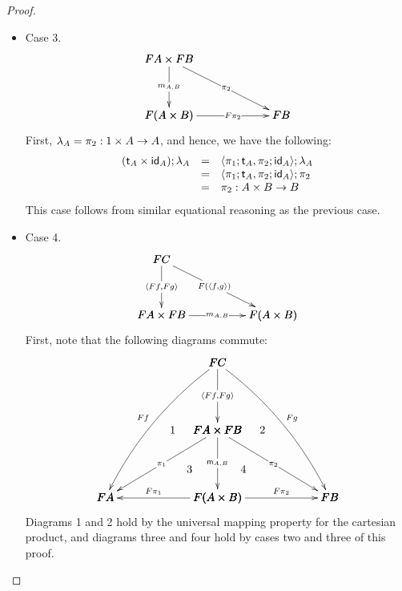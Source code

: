 \begin{proof}
\begin{itemize}
  \item[] Case 3.\\    
    \[
      \bfig    
      \btriangle|mmm|<1000,500>[
        FA \times FB`
        F(A \times B)`
        FB;
        m_{A,B}`
        \pi_2`
        F\pi_2]
      \efig
    \]
    First, $\lambda_A = \pi_2 : 1 \times A \rightarrow A$, and hence, we have the following:
      \[
      \begin{array}{lll}
        (\mathsf{t}_A \times \mathsf{id}_A);\lambda_A & = & \langle \pi_1;\mathsf{t}_A, \pi_2;\mathsf{id}_A \rangle;\lambda_A\\
        & = & \langle \pi_1;\mathsf{t}_A, \pi_2;\mathsf{id}_A \rangle;\pi_2\\
        & = & \pi_2 : A \times B \rightarrow B
      \end{array}
      \]
      This case follows from similar equational reasoning
      as the previous case.      
      
  \item[] Case 4.\\    
    \[
    \bfig
    \btriangle|mmm|<1000,500>[
      FC`
      FA \times FB`
      F(A \times B);
      \langle Ff, Fg \rangle`
      F(\langle f, g \rangle)`
      m_{A,B}]
    \efig
    \]
    First, note that the following diagrams commute:
    \[
    \bfig
    \Atrianglepair|mmmaa|/->`->`->`<-`->/<1000,600>[
      FA \times FB`
      FA`
      F(A \times B)`
      FB;
      \pi_1`
      \m{A,B}`
      \pi_2`
      F\pi_1`
      F\pi_2]
    \morphism(1000,1200)|m|<0,-600>[FC`FA \times FB;\langle Ff, Fg \rangle]
    \morphism(1000,1200)/{@{>}@/^-1em/}/<-1000,-1200>[FC`FA;Ff]
    \morphism(1000,1200)/{@{>}@/^1em/}/<1000,-1200>[FC`FB;Fg]
    \place(600,600)[1]
    \place(1400,600)[2]
    \place(750,250)[3]
    \place(1230,250)[4]
    \efig
    \]
    Diagrams 1 and 2 hold by the universal mapping property for the
    cartesian product, and diagrams three and four hold by cases two
    and three of this proof.


\end{itemize}
\end{proof}
